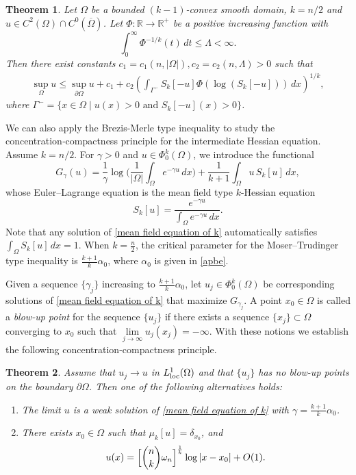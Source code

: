 \documentclass[11pt]{amsart}
\numberwithin{equation}{section}
\newtheorem{theorem}{Theorem}[section]
\numberwithin{equation}{section}
\begin{document}
 \begin{theorem}\label{thm L infty estimate}
Let $\Omega$ be a bounded $(k-1)$-convex smooth domain, $k=n/2$ and $u \in C^2(\Omega) \cap C^0(\overline{\Omega})$. Let $\Phi: \mathbb{R} \to \mathbb{R}^+$ be a positive increasing function with 
\[\int_0^\infty \Phi^{-1/k}(t) \,dt \le \Lambda < \infty.\]  
Then there exist constants $c_1=c_1(n,|\Omega|), c_2=c_2(n,\Lambda)>0$ such that
\begin{align}\label{k hessian L infty estimate}
\sup_{\Omega} u \le \sup_{\partial \Omega}u+c_1 + c_2 \left( \int_{\Gamma^-} S_k[-u] \Phi(\log(S_k[-u])) \,dx \right)^{1/k},
\end{align}
where $\Gamma^- = \{ x \in \Omega \mid u(x) > 0 \text{ and } S_k[-u](x) > 0 \}$.
\end{theorem}
 
We can also apply the Brezis-Merle type inequality to study the 
concentration‑compactness principle for the intermediate Hessian equation. Assume $k=n/2$.
For $\gamma>0$ and $u\in\Phi_0^k(\Omega)$, we introduce the 
functional
\begin{equation}\label{g-func}
	G_{\gamma}(u)=\frac{1}{\gamma}\log\bigg(\frac{1}{|\Omega|}\int_{\Omega}
	e^{-\gamma u}\,dx\bigg)+\frac{1}{k+1}\int_{\Omega}u\,S_k[u]\,dx,
\end{equation}
whose Euler--Lagrange equation is the mean field type $k$-Hessian equation
\begin{equation}\label{mean field equation of k}
	S_k[u]=\frac{e^{-\gamma u}}{\int_{\Omega}e^{-\gamma u}\,dx}.
\end{equation}
Note that any solution of \eqref{mean field equation of k} automatically satisfies 
$\int_{\Omega}S_k[u]\,dx=1$.  
When $k=\frac{n}{2}$, the critical parameter for the Moser--Trudinger type 
inequality is $\frac{k+1}{k}\alpha_0$, where $\alpha_0$ is given in \eqref{apbe}.  

Given a sequence $\{\gamma_j\}$ increasing to $\frac{k+1}{k}\alpha_0$, let 
$u_j\in\Phi_0^k(\Omega)$ be corresponding solutions of 
\eqref{mean field equation of k} that maximize $G_{\gamma_j}$.  
A point $x_0\in\Omega$ is called a \emph{blow-up point} for the sequence 
$\{u_j\}$ if there exists a sequence $\{x_j\}\subset\Omega$ converging to 
$x_0$ such that $\lim\limits_{j\to\infty}u_j(x_j)=-\infty$.  
With these notions we establish the following concentration‑compactness 
principle.

\begin{theorem}\label{mean-field-compactness}
	Assume that $u_j\to u$ in $L^1_{\rm loc}(\Omega)$ and that $\{u_j\}$ has 
	no blow-up points on the boundary $\partial\Omega$.  Then one of the 
	following alternatives holds:
	\begin{enumerate}
		\item[(1)] The limit $u$ is a weak solution of 
		\eqref{mean field equation of k} with $\gamma=\frac{k+1}{k}\alpha_0$.
		\item[(2)] There exists $x_0\in\Omega$ such that $\mu_k[u]=\delta_{x_0}$, and
		\[
		u(x)=\Bigl[\binom{n}{k}\omega_n\Bigr]^{\frac{1}{k}}\log|x-x_0|+O(1).
		\]
	\end{enumerate}
\end{theorem}
\end{document}
